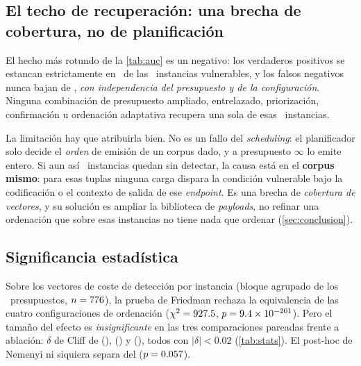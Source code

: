 \subsection{El techo de recuperación: una brecha de cobertura, no de planificación}
\label{sec:res-techo}

El hecho más rotundo de la \cref{tab:auc} es un negativo: los verdaderos
positivos se estancan estrictamente en \ValorTPtecho{}~de las
\NumVulnerables{}~instancias vulnerables, y los falsos negativos nunca bajan de
\ValorFNtecho{}, \emph{con independencia del presupuesto y de la
configuración}. Ninguna combinación de presupuesto ampliado, entrelazado,
priorización, confirmación u ordenación adaptativa recupera una sola de esas
\ValorFNtecho{}~instancias.

La limitación hay que atribuirla bien. No es un fallo del \emph{scheduling}:
el planificador solo decide el \emph{orden} de emisión de un corpus dado, y a
presupuesto $\infty$ lo emite entero. Si aun así \ValorFNtecho{}~instancias
quedan sin detectar, la causa está en el \textbf{corpus mismo}: para esas
tuplas  ninguna carga dispara la condición
vulnerable bajo la codificación o el contexto de salida de ese \emph{endpoint}.
Es una brecha de \emph{cobertura de vectores}, y su solución es ampliar la
biblioteca de \emph{payloads}, no refinar una ordenación que sobre esas
instancias no tiene nada que ordenar (\cref{sec:conclusion}).

\subsection{Significancia estadística}
\label{sec:res-stats}

Sobre los vectores de coste de detección por instancia (bloque agrupado de los
\NumBloquesCompletos{}~presupuestos, $n = \num{776}{}$), la prueba de
Friedman rechaza la equivalencia de las cuatro configuraciones de ordenación
($\chi^2 = \num{927.5}{}$, $p = \num{9.4e-201}{}$). Pero el tamaño del
efecto es \emph{insignificante} en las tres comparaciones pareadas
 frente a ablación: $\delta$ de Cliff de
\ValorCliffNoInterleave{} (), \ValorCliffNoPriority{}
() y \ValorCliffNoRuntimeConfirm{}
(), todos con $\lvert\delta\rvert < \num{0.02}$
(\cref{tab:stats}). El post-hoc de Nemenyi ni siquiera separa
 del 
($p = \num{0.057}{}$).

